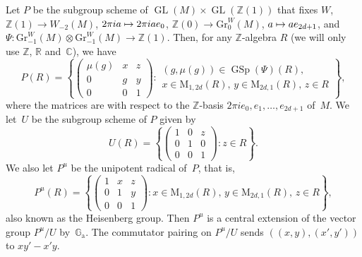 \documentclass[11pt]{article}
\providecommand{\C}{}
\providecommand{\G}{}
\def\mto{\mathchoice{\longmapsto}{\mapsto}{\mapsto}{\mapsto}}
\theoremstyle{plain}
\theoremstyle{definition}
\numberwithin{equation}{subsection}
\renewcommand{\C}{\mathbb C}
\newcommand{\R}{\mathbb R}
\newcommand{\Z}{\mathbb Z}
\renewcommand{\G}{\mathbb G}
\newcommand{\Ga}{\G_{\mathrm{a}}}
\newcommand{\Gr}{\mathrm{Gr}}
\newcommand{\rmM}{\mathrm{M}}
\DeclareMathOperator{\GL}{GL}
\DeclareMathOperator{\GSp}{GSp}
\begin{document}
Let $P$ be the subgroup scheme of $\GL(M)\times\GL(\Z(1))$ that fixes
$W$, $\Z(1)\!\to\! W_{-2}(M)$, $2\pi i a\mto 2\pi i ae_0$,
$\Z(0)\to\Gr^W_0(M)$, $a\mto ae_{2d+1}$, and $\Psi\colon
\Gr^W_{-1}(M)\otimes \Gr^W_{-1}(M)\to\Z(1)$. Then, for any
$\Z$-algebra $R$ (we will only use $\Z$, $\R$ and~$\C$), we have
\begin{equation}
\label{eq:def_P}
P(R) =
\left\{
\begin{pmatrix}
\mu(g) & x & z\\
0 & g & y\\
0 & 0 & 1
\end{pmatrix} :
\begin{array}{c}
\text{$(g,\mu(g))\in\GSp(\Psi)(R)$,}\\[5pt]
\text{$x\in\rmM_{1,2d}(R)$, $y\in\rmM_{2d,1}(R)$, $z\in R$}
\end{array}
\right\},
\end{equation}
where the matrices are with respect to the $\Z$-basis $2\pi ie_0,
e_1,\ldots,e_{2d+1}$ of~$M$. We let~$U$ be the subgroup scheme of $P$
given by
\[
U(R) =
\left\{
\begin{pmatrix}
1 & 0 & z\\
0 & 1 & 0\\
0 & 0 & 1
\end{pmatrix} :
\text{$z\in R$}
\right\}.
\]
We also let $P^u$ be the
unipotent radical of~$P$, that is,
\[
P^u(R) =
\left\{
\begin{pmatrix}
1 & x & z\\
0 & 1 & y\\
0 & 0 & 1
\end{pmatrix} :
\text{$x\in\rmM_{1,2d}(R)$, $y\in\rmM_{2d,1}(R)$, $z\in R$}
\right\},
\]
also known as the Heisenberg group.
Then $P^u$ is a central extension of the vector group $P^u/U$
by~$\Ga$. The commutator pairing on $P^u/U$ sends
$((x,y),(x',y'))$ to $xy'-x'y$.
\end{document}
